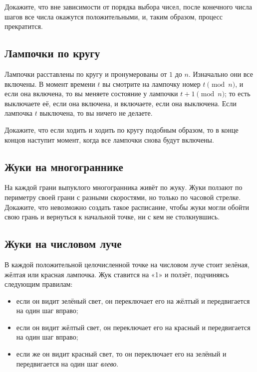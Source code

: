 Докажите, что вне зависимости от порядка выбора чисел, после конечного числа шагов все числа окажутся положительными, и, таким образом, процесс прекратится.

\subsection*{Лампочки по кругу}%

Лампочки расставлены по кругу и пронумерованы от $1$ до $n$.
Изначально они все включены.
В момент времени $t$ вы смотрите на лампочку номер $t \pmod{n}$, и если она включена, то вы меняете состояние у лампочки $t + 1 \pmod{n}$;
то есть выключаете её, если она включена, и включаете, если она выключена.
Если лампочка $t$ выключена, то вы ничего не делаете.

Докажите, что если ходить и ходить по кругу подобным образом, то в конце концов наступит момент, когда все лампочки снова будут включены.

\subsection*{Жуки на многограннике}%

На каждой грани выпуклого многогранника живёт по жуку.
Жуки ползают по периметру своей грани с разными скоростями, но только по часовой стрелке.
Докажите, что невозможно создать такое расписание, чтобы жуки могли обойти свою грань и вернуться к начальной точке, ни с кем не столкнувшись.

\subsection*{Жуки на числовом луче}%

В каждой положительной целочисленной точке на числовом луче стоит зелёная, жёлтая или красная лампочка.
Жук ставится на «1» и ползёт, подчиняясь следующим правилам:
\begin{itemize}
\item если он видит зелёный свет, он переключает его на жёлтый и передвигается на один шаг вправо; 
\item если он видит жёлтый свет, он переключает его на красный и передвигается на один шаг вправо; 
\item если же он видит красный свет, то он переключает его на зелёный и передвигается на один шаг \emph{влево}.
\end{itemize}

